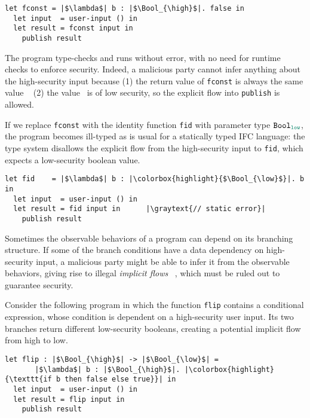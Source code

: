 \begin{lstlisting}[style=tt]
  let fconst = |$\lambda$| b : |$\Bool_{\high}$|. false in
  let input  = user-input () in
  let result = fconst input in
    publish result
\end{lstlisting}

The program type-checks and runs without error, with no need for
runtime checks to enforce security. Indeed, a malicious party cannot
infer anything about the high-security input because (1) the return
value of \texttt{fconst} is always the same value \false~ (2)
the value \false~is of low security, so the explicit flow
into \texttt{publish} is allowed.

If we replace \texttt{fconst} with the identity function \texttt{fid} with
parameter type $\Bool_{\low}$, the program becomes ill-typed as is usual for a
statically typed IFC language: the type system disallows the explicit flow from
the high-security input to \texttt{fid}, which expects a low-security boolean
value.

\begin{lstlisting}[style=tt]
  let fid    = |$\lambda$| b : |\colorbox{highlight}{$\Bool_{\low}$}|. b in
  let input  = user-input () in
  let result = fid input in      |\graytext{// static error}|
    publish result
\end{lstlisting}

Sometimes the observable behaviors of a program can depend on its branching
structure. If some of the branch conditions have a data dependency on
high-security input, a malicious party might be able to infer it from the
observable behaviors, giving rise to illegal \textit{implicit flows}
~\parencite{denning1976lattice}, which must be ruled out to guarantee security.

Consider the following program in which the function \texttt{flip} contains a
conditional expression, whose condition is dependent on a high-security user
input. Its two branches return different low-security booleans, creating a
potential implicit flow from high to low.

\begin{lstlisting}[style=tt]
  let flip : |$\Bool_{\high}$| -> |$\Bool_{\low}$| =
       |$\lambda$| b : |$\Bool_{\high}$|. |\colorbox{highlight}{\texttt{if b then false else true}}| in
  let input  = user-input () in
  let result = flip input in
    publish result
\end{lstlisting}


